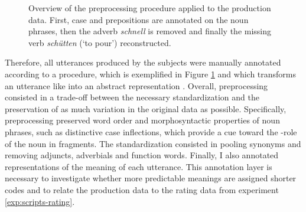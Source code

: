 \begin{figure}[t]
\caption{Overview of the preprocessing procedure applied to the production data. First, case and prepositions are annotated on the noun phrases, then the adverb \textit{schnell} is removed and finally the missing verb \textit{schütten} (`to pour') reconstructed.\label{fig:prod-preprocessing}}
\end{figure}
%
Therefore, all utterances produced by the subjects were manually annotated according to a procedure, which is exemplified in Figure \ref{fig:prod-preprocessing} and which transforms an utterance like \Next[a] into an abstract representation \Next[b]. Overall, preprocessing consisted in a trade-off between the necessary standardization and the preservation of as much variation in the original data as possible. Specifically, preprocessing preserved word order and morphosyntactic properties of noun phrases, such as distinctive case inflections, which provide a cue toward the \texttheta-role of the noun in fragments. The standardization consisted in pooling synonyms and removing adjuncts, adverbials and function words. Finally, I also annotated representations of the meaning of each utterance. This annotation layer is necessary to investigate whether more predictable meanings are assigned shorter codes and to relate the production data to the rating data from experiment \ref{exp:scripts-rating}.


